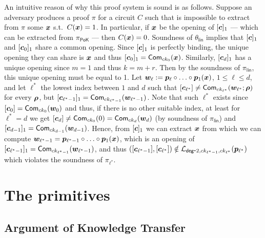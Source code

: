 An intuitive reason of why this proof system is sound is as follows. Suppose an adversary produces a proof $\pi$ for a circuit $C$ such that is impossible to extract from $\pi$ some ${\boldsymbol{x}}$ s.t.~$C({\boldsymbol{x}})=1$. In particular, if ${\boldsymbol{x}}$ be the opening of $[{\boldsymbol{c}}]_1$ --- which can be extracted from $\pi_\mathsf{PoK}$ --- then $C({\boldsymbol{x}})=0$. Soundness of $\theta_\mathsf{lin}$ implies that $[{\boldsymbol{c}}]_1$ and $[{\boldsymbol{c}}_{0}]_1$ share a common opening. Since $[{\boldsymbol{c}}]_1$ is perfectly binding, the unique opening they can share is ${\boldsymbol{x}}$ and thus $[{\boldsymbol{c}}_{0}]_1=\mathsf{Com}_{ck_{0}}({\boldsymbol{x}})$. Similarly, $[{\boldsymbol{c}}_d]_1$ has a unique opening since $m=1$ and thus $k=m+r$. Then by the soundness of $\pi_\mathsf{lin}$, this unique opening must be equal to 1.
Let ${\boldsymbol{w}}_\ell := {\boldsymbol{p}}_\ell\circ\ldots\circ {\boldsymbol{p}}_1({\boldsymbol{x}})$, $1\leq\ell\leq d$, and let $\ell^*$ the lowest index between $1$ and $d$ such that $[{\boldsymbol{c}}_{\ell^*}]\neq\mathsf{Com}_{ck_{\ell^*}}({\boldsymbol{w}}_{\ell^*};{\boldsymbol{\rho}})$ for every ${\boldsymbol{\rho}}$, but $[{\boldsymbol{c}}_{\ell^*-1}]_1 = \mathsf{Com}_{ck_{\ell^*-1}}({\boldsymbol{w}}_{\ell^*-1})$. Note that such $\ell^*$ exists since $[{\boldsymbol{c}}_0] = \mathsf{Com}_{ck_0}({\boldsymbol{w}}_0)$ and thus, if there is no other suitable index, at least for $\ell^*=d$ we get $[{\boldsymbol{c}}_d]\neq\mathsf{Com}_{ck_0}(0)=\mathsf{Com}_{ck_d}({\boldsymbol{w}}_d)$ (by soundness of $\pi_\mathsf{lin}$) and $[{\boldsymbol{c}}_{d-1}]_1=\mathsf{Com}_{ck_{d-1}}({\boldsymbol{w}}_{d-1})$. Hence, from $[{\boldsymbol{c}}]_1$ we can extract ${\boldsymbol{x}}$ from which we can compute ${\boldsymbol{w}}_{\ell^*-1} = {\boldsymbol{p}}_{\ell^*-1}\circ\ldots\circ {\boldsymbol{p}}_{1}({\boldsymbol{x}})$, which is an opening of $[{\boldsymbol{c}}_{\ell^*-1}]_1=\mathsf{Com}_{ck_{\ell^*-1}}({\boldsymbol{w}}_{\ell^*-1})$, and thus $([{\boldsymbol{c}}_{\ell^*-1}],[{\boldsymbol{c}}_{\ell^*}])\notin\mathcal{L}_{\mathsf{deg}\mbox{-}2,ck_{\ell^*-1},ck_{\ell^*}}({\boldsymbol{p}}_{\ell^*})$ which violates the soundness of $\pi_{\ell^*}$.

\section{The primitives}

\subsection{Argument of Knowledge Transfer}

